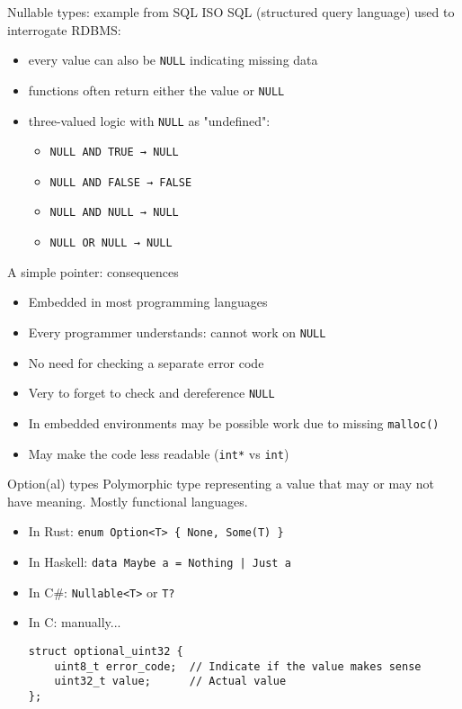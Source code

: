 \documentclass[aspectratio=169,14pt]{beamer}
\begin{document}
\begin{frame}{Nullable types: example from SQL}
ISO SQL (structured query language) used to interrogate RDBMS:

\begin{itemize}
    \item every value can also be \texttt{NULL} indicating missing data
    \item functions often return either the value or \texttt{NULL}
    \item three-valued logic with \texttt{NULL} as "undefined":\\
    \begin{itemize}
        \item \texttt{NULL AND  TRUE → NULL}
        \item \texttt{NULL AND FALSE → FALSE}
        \item \texttt{NULL AND  NULL → NULL}
        \item \texttt{NULL  OR  NULL → NULL}
    \end{itemize}
\end{itemize}
\end{frame}



\begin{frame}[fragile]{A simple pointer: consequences}
\begin{itemize}
    \item[\good] Embedded in most programming languages
    \item[\good] Every programmer understands: cannot work on \texttt{NULL}
    \item[\good] No need for checking a separate error code
    \item[\bad] Very to forget to check and dereference \texttt{NULL}
    \item[\meh] In embedded environments may be possible work due to missing \texttt{malloc()}
    \item[\meh] May make the code less readable (\texttt{int*} vs \texttt{int})
\end{itemize}
\end{frame}



\begin{frame}[fragile]{Option(al) types}
Polymorphic type representing a value that may or may not have meaning. Mostly functional languages.
\begin{itemize}
    \item In Rust: \texttt{enum Option<T> \{ None, Some(T) \}}
    \item In Haskell: \texttt{data Maybe a = Nothing | Just a}
    \item In C\#: \texttt{Nullable<T>} or \texttt{T?}
    \item In C: manually...
\begin{lstlisting}[style=cstyle]
struct optional_uint32 {
    uint8_t error_code;  // Indicate if the value makes sense
    uint32_t value;      // Actual value
};
\end{lstlisting}
\end{itemize}
\end{frame}
\end{document}
